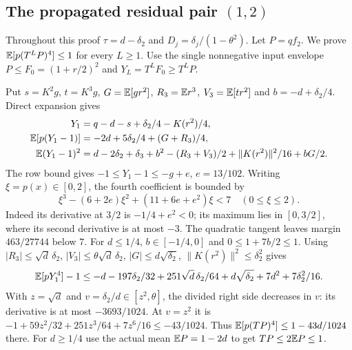 \subsection[The propagated residual pair (1,2)]{The propagated residual pair $(1,2)$}\label{loc:S21}
Throughout this proof $\tau=d-\delta_{2}$ and $D_j=\delta_{j}/(1-\theta^2)$.
Let $P=qf_2$. We prove $\mathbb E[p(T^LP)^4]\le1$ for every $L\ge1$.
Use the single nonnegative input envelope
$P\le F_0=(1+r/2)^2$ and $Y_L=T^LF_0\ge T^LP$.

Put $s=K^2g$, $t=K^3g$, $G=\mathbb E[gr^2]$, $R_3=\mathbb E r^3$,
$V_3=\mathbb E[tr^2]$ and $b=-d+\delta_{2}/4$. Direct expansion gives
\begin{align*}
 Y_1&=q-d-s+\delta_{2}/4-K(r^2)/4,\\
 \mathbb E[p(Y_1-1)]&=-2d+5\delta_{2}/4+(G+R_3)/4,\\
 \mathbb E(Y_1-1)^2&=d-2\delta_{2}+\delta_{3}+b^2-(R_3+V_3)/2
                         +\|K(r^2)\|^2/16+bG/2.
\end{align*}
The row bound gives $-1\le Y_1-1\le-g+e$, $e=13/102$.
Writing $\xi=p(x)\in[0,2]$, the fourth coefficient is bounded by
\[
 \xi^3-(6+2e)\xi^2+(11+6e+e^2)\xi<7\quad(0\le \xi\le2).
\]
Indeed its derivative at $3/2$ is $-1/4+e^2<0$; its maximum lies
in $[0,3/2]$, where its second derivative is at most $-3$.
The quadratic tangent leaves margin $463/27744$ below $7$.
For $d\le1/4$, $b\in[-1/4,0]$ and $0\le1+7b/2\le1$.
Using $|R_3|\le\sqrt d\,\delta_{2}$, $|V_3|\le\theta\sqrt d\,\delta_{2}$,
$|G|\le d\sqrt{\delta_{2}}$, $\|K(r^2)\|^2\le \delta_{2}^2$ gives
\[
 \mathbb E[pY_1^4]-1\le-d-197\delta_{2}/32+251\sqrt d\,\delta_{2}/64
                       +d\sqrt{\delta_{2}}+7d^2+7\delta_{2}^2/16.
\]
With $z=\sqrt d$ and $v=\delta_{2}/d\in[z^2,\theta]$, the divided right side
decreases in $v$: its derivative is at most $-3693/1024$.
At $v=z^2$ it is
$-1+59z^2/32+251z^3/64+7z^6/16\le-43/1024$.
Thus $\mathbb E[p(TP)^4]\le1-43d/1024$ there.
For $d\ge1/4$ use the actual mean $\mathbb E P=1-2d$ to get $TP\le2\mathbb E P\le1$.


